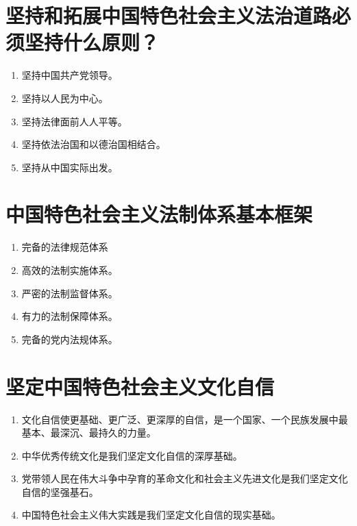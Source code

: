 \documentclass[12pt, a4paper, oneside]{ctexbook}
\begin{document}
\section{坚持和拓展中国特色社会主义法治道路必须坚持什么原则？}

\begin{enumerate}
\item 坚持中国共产党领导。

\item 坚持以人民为中心。

\item 坚持法律面前人人平等。

\item 坚持依法治国和以德治国相结合。

\item 坚持从中国实际出发。
\end{enumerate}

\section{中国特色社会主义法制体系基本框架}
\begin{enumerate}
\item 完备的法律规范体系

\item 高效的法制实施体系。

\item 严密的法制监督体系。

\item 有力的法制保障体系。

\item 完备的党内法规体系。
\end{enumerate}

\section{坚定中国特色社会主义文化自信}

\begin{enumerate}
\item 文化自信使更基础、更广泛、更深厚的自信，是一个国家、一个民族发展中最基本、最深沉、最持久的力量。

\item 中华优秀传统文化是我们坚定文化自信的深厚基础。

\item 党带领人民在伟大斗争中孕育的革命文化和社会主义先进文化是我们坚定文化自信的坚强基石。

\item 中国特色社会主义伟大实践是我们坚定文化自信的现实基础。
\end{enumerate}
\end{document}
